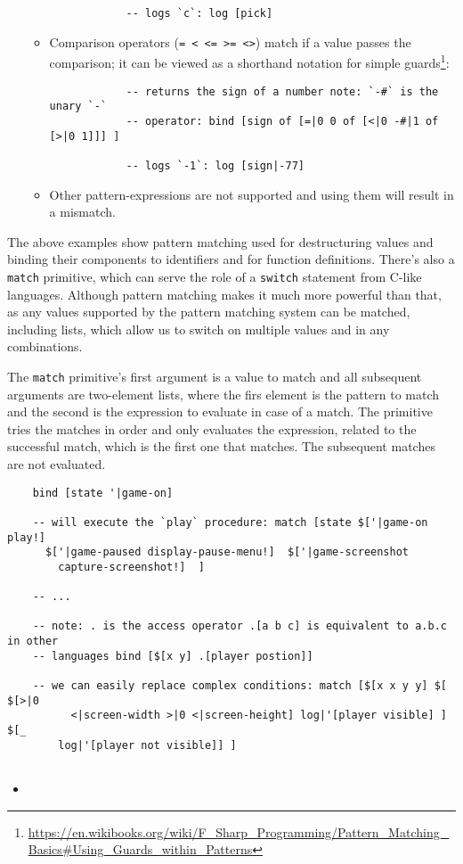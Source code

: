 \begin{itemize}
\begin{itemize}
\begin{lstlisting}
            -- logs `c`: log [pick]
        \end{lstlisting}
        \item Comparison operators (\texttt{= < <= >= <>}) match if a value
          passes the comparison; it can be viewed as a shorthand notation for
          simple
          guards\footnote{\url{https://en.wikibooks.org/wiki/F_Sharp_Programming/Pattern_Matching_Basics\#Using_Guards_within_Patterns}}:
        \begin{lstlisting}
            -- returns the sign of a number note: `-#` is the unary `-`
            -- operator: bind [sign of [=|0 0 of [<|0 -#|1 of [>|0 1]]] ]
            
            -- logs `-1`: log [sign|-77]
        \end{lstlisting}
        \item Other pattern-expressions are not supported and using them will
          result in a mismatch.
    \end{itemize}
\end{itemize}

The above examples show pattern matching used for destructuring values and
binding their components to identifiers and for function definitions. There's
also a \texttt{match} primitive, which can serve the role of a \texttt{switch}
statement from C-like languages. Although pattern matching makes it much more
powerful than that, as any values supported by the pattern matching system can
be matched, including lists, which allow us to switch on multiple values and in
any combinations.

The \texttt{match} primitive's first argument is a value to match and all
subsequent arguments are two-element lists, where the firs element is the
pattern to match and the second is the expression to evaluate in case of a
match. The primitive tries the matches in order and only evaluates the
expression, related to the successful match, which is the first one that
matches. The subsequent matches are not evaluated.

\begin{lstlisting}
    bind [state '|game-on]
    
    -- will execute the `play` procedure: match [state $['|game-on play!]
      $['|game-paused display-pause-menu!]  $['|game-screenshot
        capture-screenshot!]  ]
    
    -- ...

    -- note: . is the access operator .[a b c] is equivalent to a.b.c in other
    -- languages bind [$[x y] .[player postion]]
    
    -- we can easily replace complex conditions: match [$[x x y y] $[ $[>|0
          <|screen-width >|0 <|screen-height] log|'[player visible] ] $[_
        log|'[player not visible]] ]
    
\end{lstlisting}
\begin{itemize}
    \item 
\end{itemize}

